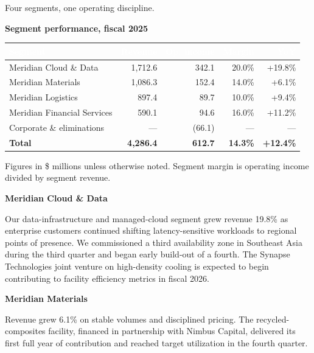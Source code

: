 \documentclass[11pt,oneside,a4paper]{scrbook}
\newcommand{\goldrule}{\noindent{\color{merGold}\rule{\linewidth}{1.1pt}}\par\vspace{2pt}\noindent{\color{merNavy!25}\rule{\linewidth}{0.4pt}}\vspace{10pt}\par}
\newcommand{\sectionlede}[1]{{\color{merSlate}\large #1}\par\vspace{6pt}}
\begin{document}
\goldrule

\sectionlede{Four segments, one operating discipline.}

{\bfseries\color{merNavy} Segment performance, fiscal 2025}\par
\vspace{4pt}
\begin{tabularx}{\linewidth}{@{}Xrrrr@{}}
\toprule
\rowcolor{merNavy}
\textcolor{white}{\bfseries Segment} & \textcolor{white}{\bfseries Revenue} & \textcolor{white}{\bfseries Op. income} & \textcolor{white}{\bfseries Margin} & \textcolor{white}{\bfseries YoY} \\
\midrule
Meridian Cloud \& Data & 1,712.6 & 342.1 & 20.0\% & +19.8\% \\
Meridian Materials & 1,086.3 & 152.4 & 14.0\% & +6.1\% \\
Meridian Logistics & 897.4 & 89.7 & 10.0\% & +9.4\% \\
Meridian Financial Services & 590.1 & 94.6 & 16.0\% & +11.2\% \\
\midrule
Corporate \& eliminations & --- & (66.1) & --- & --- \\
\midrule
\rowcolor{merPaper}
\textbf{Total} & \textbf{4,286.4} & \textbf{612.7} & \textbf{14.3\%} & \textbf{+12.4\%} \\
\bottomrule
\end{tabularx}
\par\vspace{10pt}
{\footnotesize\color{merSlate} Figures in \$ millions unless otherwise noted. Segment margin is operating income divided by segment revenue.}

\vspace{14pt}
{\bfseries\color{merNavy} Meridian Cloud \& Data}\par
Our data-infrastructure and managed-cloud segment grew revenue 19.8\% as enterprise customers continued shifting latency-sensitive workloads to regional points of presence. We commissioned a third availability zone in Southeast Asia during the third quarter and began early build-out of a fourth. The Synapse Technologies joint venture on high-density cooling is expected to begin contributing to facility efficiency metrics in fiscal 2026.

{\bfseries\color{merNavy} Meridian Materials}\par
Revenue grew 6.1\% on stable volumes and disciplined pricing. The recycled-composites facility, financed in partnership with Nimbus Capital, delivered its first full year of contribution and reached target utilization in the fourth quarter.
\end{document}
